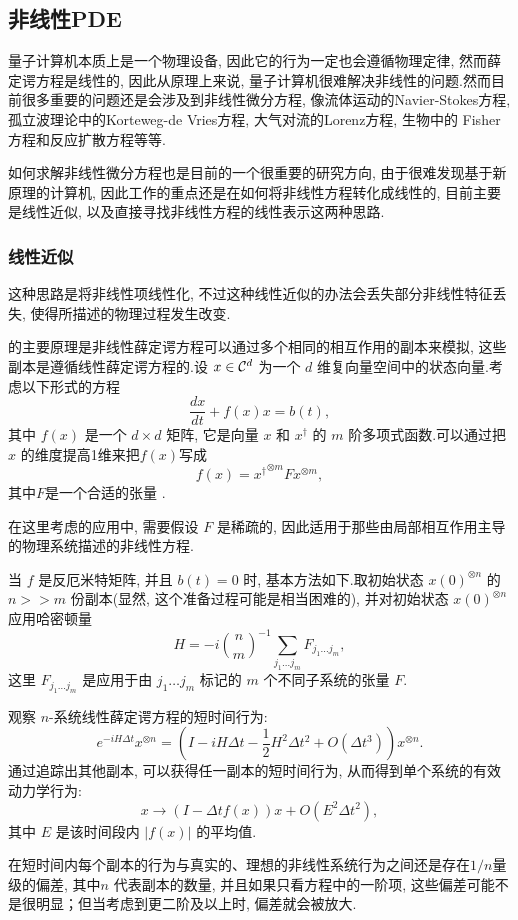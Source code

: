 \subsection{非线性PDE}
量子计算机本质上是一个物理设备, 因此它的行为一定也会遵循物理定律, 然而薛定谔方程是线性的, 因此从原理上来说, 量子计算机很难解决非线性的问题\cite{41}.然而目前很多重要的问题还是会涉及到非线性微分方程, 像流体运动的Navier-Stokes方程, 孤立波理论中的Korteweg-de Vries方程, 大气对流的Lorenz方程, 生物中的 Fisher方程和反应扩散方程等等.\par
如何求解非线性微分方程也是目前的一个很重要的研究方向, 由于很难发现基于新原理的计算机, 因此工作的重点还是在如何将非线性方程转化成线性的, 目前主要是线性近似, 以及直接寻找非线性方程的线性表示这两种思路.
\subsubsection{线性近似}
这种思路是将非线性项线性化, 不过这种线性近似的办法会丢失部分非线性特征丢失, 使得所描述的物理过程发生改变.
\begin{method}
	\cite{42}的主要原理是非线性薛定谔方程可以通过多个相同的相互作用的副本来模拟, 这些副本是遵循线性薛定谔方程的.设 $x \in {\cal C}^d$ 为一个 $d$ 维复向量空间中的状态向量.考虑以下形式的方程
	\begin{equation}
		\frac{dx}{dt} + f(x) x = b(t), \label{proximity}
	\end{equation}
	其中 $f(x)$ 是一个 $d \times d$ 矩阵, 它是向量 $x$ 和 $x^\dagger$ 的 $m$ 阶多项式函数.可以通过把 $x$ 的维度提高1维来把$f(x)$写成
	\begin{equation}
		f(x) = {x^\dagger}^{\otimes m} F x^{\otimes m}, 
	\end{equation}
	其中$F$是一个合适的张量 . 
	
	在这里考虑的应用中, 需要假设 $F$ 是稀疏的, 因此适用于那些由局部相互作用主导的物理系统描述的非线性方程.
	
	
	当 $f$ 是反厄米特矩阵, 并且 $b(t)=0$ 时, 基本方法如下.取初始状态 $x(0)^{\otimes n }$ 的 $n>>m$ 份副本(显然, 这个准备过程可能是相当困难的), 并对初始状态 $x(0)^{\otimes n }$ 应用哈密顿量
	\begin{equation}
		H = -i {n \choose m}^{-1} \sum_{j_1\ldots j_m} F_{j_1 \ldots j_m}, 
	\end{equation}
	这里 $F_{j_1\ldots j_m}$ 是应用于由 $j_1 \ldots j_m$ 标记的 $m$ 个不同子系统的张量 $F$.
	
	观察 $n$-系统线性薛定谔方程的短时间行为:
	\begin{equation}
		e^{-iH\Delta t} x^{\otimes n} = (I - iH\Delta t - \frac{1}{2} H^2 \Delta t^2 + O(\Delta t^3) ) x^{\otimes n}.
	\end{equation}
	通过追踪出其他副本, 可以获得任一副本的短时间行为, 从而得到单个系统的有效动力学行为:
	\begin{equation}
		x \rightarrow ( I -  \Delta t f(x)) x + O(E^2\Delta t^2), 
	\end{equation}
	其中 $E$ 是该时间段内 $|f(x)|$ 的平均值.
	
	在短时间内每个副本的行为与真实的、理想的非线性系统行为之间还是存在$1/n$量级的偏差, 其中$n$ 代表副本的数量, 并且如果只看方程中的一阶项, 这些偏差可能不是很明显；但当考虑到更二阶及以上时, 偏差就会被放大.
	
\end{method}
